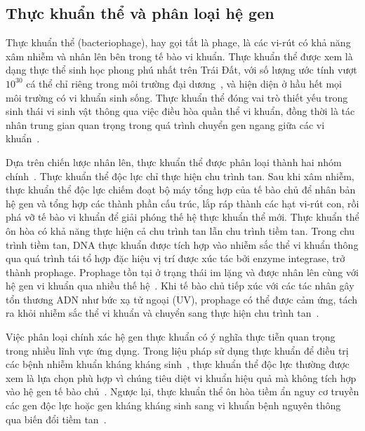 \subsection{Thực khuẩn thể và phân loại hệ gen}
\label{subsec:bacteriophage}

Thực khuẩn thể (bacteriophage), hay gọi tắt là phage, là các vi-rút có khả năng xâm nhiễm và nhân lên bên trong tế bào vi khuẩn. Thực khuẩn thể được xem là dạng thực thể sinh học phong phú nhất trên Trái Đất, với số lượng ước tính vượt $10^{30}$ cá thể chỉ riêng trong môi trường đại dương~\cite{suttle2007marine}, và hiện diện ở hầu hết mọi môi trường có vi khuẩn sinh sống. Thực khuẩn thể đóng vai trò thiết yếu trong sinh thái vi sinh vật thông qua việc điều hòa quần thể vi khuẩn, đồng thời là tác nhân trung gian quan trọng trong quá trình chuyển gen ngang giữa các vi khuẩn~\cite{koskella2014bacteria}.

Dựa trên chiến lược nhân lên, thực khuẩn thể được phân loại thành hai nhóm chính~\cite{mcnair2012phacts,wu2021deephage}. Thực khuẩn thể độc lực chỉ thực hiện chu trình tan. Sau khi xâm nhiễm, thực khuẩn thể độc lực chiếm đoạt bộ máy tổng hợp của tế bào chủ để nhân bản hệ gen và tổng hợp các thành phần cấu trúc, lắp ráp thành các hạt vi-rút con, rồi phá vỡ tế bào vi khuẩn để giải phóng thế hệ thực khuẩn thể mới. Thực khuẩn thể ôn hòa có khả năng thực hiện cả chu trình tan lẫn chu trình tiềm tan. Trong chu trình tiềm tan, DNA thực khuẩn được tích hợp vào nhiễm sắc thể vi khuẩn thông qua quá trình tái tổ hợp đặc hiệu vị trí được xúc tác bởi enzyme integrase, trở thành prophage. Prophage tồn tại ở trạng thái im lặng và được nhân lên cùng với hệ gen vi khuẩn qua nhiều thế hệ~\cite{howard2017lysogeny}. Khi tế bào chủ tiếp xúc với các tác nhân gây tổn thương ADN như bức xạ tử ngoại (UV), prophage có thể được cảm ứng, tách ra khỏi nhiễm sắc thể vi khuẩn và chuyển sang thực hiện chu trình tan~\cite{howard2017lysogeny}.

Việc phân loại chính xác hệ gen thực khuẩn có ý nghĩa thực tiễn quan trọng trong nhiều lĩnh vực ứng dụng. Trong liệu pháp sử dụng thực khuẩn để điều trị các bệnh nhiễm khuẩn kháng kháng sinh~\cite{gordillo2019phage}, thực khuẩn thể độc lực thường được xem là lựa chọn phù hợp vì chúng tiêu diệt vi khuẩn hiệu quả mà không tích hợp vào hệ gen tế bào chủ~\cite{gordillo2019phage,kortright2019phage}. Ngược lại, thực khuẩn thể ôn hòa tiềm ẩn nguy cơ truyền các gen độc lực hoặc gen kháng kháng sinh sang vi khuẩn bệnh nguyên thông qua biến đổi tiềm tan~\cite{brussow2004phages,gummalla2023temperate}.

